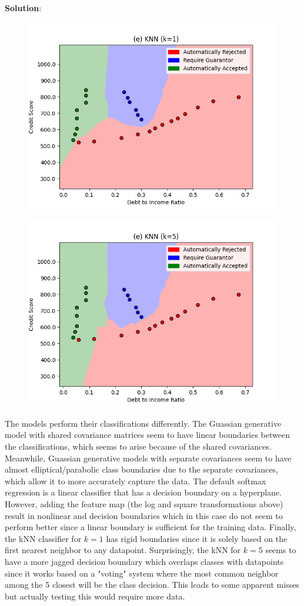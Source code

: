 \documentclass[submit]{../harvardml}
\newenvironment{solution}{
    \vspace{2mm}
    \color{blue}\noindent\textbf{Solution}:
}{}
\begin{document}
\begin{solution}
\begin{enumerate}
\begin{figure}[H]
\end{figure}
\begin{figure}[H]
    \centering
    \includegraphics[width=0.5\linewidth]{hw2/(e) KNN (k=1).png}
\end{figure}
\begin{figure}[H]
    \centering
    \includegraphics[width=0.5\linewidth]{hw2/(e) KNN (k=5).png}
\end{figure}

The models perform their classifications differently. The Guassian generative model with shared covariance matrices seem to have linear boundaries between the classifications, which seems to arise because of the shared covariances. Meanwhile, Guassian generative models with separate covariances seem to have almost elliptical/parabolic class boundaries due to the separate covariances, which allow it to more accurately capture the data. The default softmax regression is a linear classifier that has a decision boundary on a hyperplane. However, adding the feature map (the log and square transformations above) result in nonlinear and decision boundaries which in this case do not seem to perform better since a linear boundary is sufficient for the training data. Finally, the kNN classifier for $k=1$ has rigid boundaries since it is solely based on the first nearest neighbor to any datapoint. Surprisingly, the kNN for $k=5$ seems to have a more jagged decision boundary which overlaps classes with datapoints since it works based on a "voting" system where the most common neighbor among the 5 closest will be the class decision. This leads to some apparent misses but actually testing this would require more data.



\end{enumerate}
\end{solution}
\end{document}
